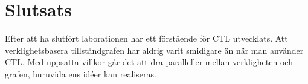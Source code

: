 \section{Slutsats}

Efter att ha slutfört laborationen har ett förstående för CTL utvecklats. Att verklighetsbasera tillståndgrafen har aldrig varit smidigare än när man använder CTL. Med uppsatta villkor går det att dra paralleller mellan verkligheten och grafen, huruvida ens idéer kan realiseras.